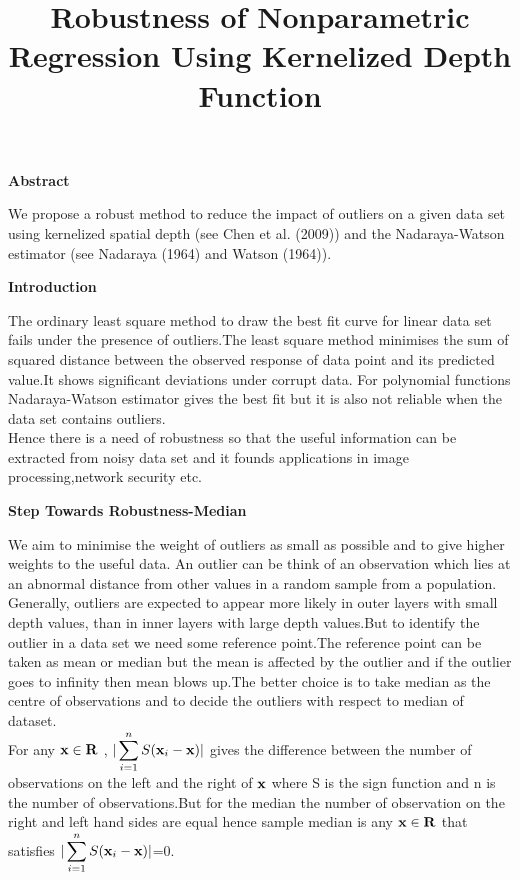 \documentclass[11pt]{article}
\newcommand{\xvec}{\mbox{\bf x}}
\begin{document}
\title{\vspace{-0.25in} Robustness of Nonparametric Regression Using Kernelized Depth Function}
\author{}
\maketitle
\begin{flushleft}
\large
\vspace{0.1in}
\textbf{Abstract}
\vspace{0.1in}

We propose a robust method to reduce the impact of outliers on a given data set using kernelized spatial depth (see Chen et al. (2009)) and the Nadaraya-Watson estimator (see Nadaraya (1964) and Watson (1964)).

\vspace{0.1in}
\textbf{Introduction}
\vspace{0.1in}

The ordinary least square method to draw the best fit curve for linear data set fails under the presence of outliers.The least square method minimises the sum of squared distance between the observed response of data point and its predicted value.It shows significant deviations under corrupt data.
For polynomial functions Nadaraya-Watson estimator gives the best fit but it is also not reliable when the data set contains outliers. \\
Hence there is a need of robustness so that the useful information can be extracted from noisy data set and it founds applications in image processing,network security etc.

\vspace{0.1in}
\textbf{Step Towards Robustness-Median}
\vspace{0.1in}

We aim to minimise the weight of outliers as small as possible and to give  higher weights to the useful data. 
An outlier can be think of an observation which lies at an abnormal distance from other values in a random sample from a population. Generally, outliers are expected to appear more likely in outer layers with small depth values, than in inner layers with large depth values.But to identify the outlier in a data set we need some reference point.The reference point can be taken as mean or median but the mean is affected by the outlier and if the outlier goes to infinity then mean blows up.The better choice is to take median as the centre of observations and to decide the outliers with respect to median of dataset. \\
For any $\xvec \in \mathbf{R}$ , $\displaystyle{\vert \sum\limits_{i=1}^n S(\xvec_i-\xvec)\vert}$ gives the
  difference between the number of observations on the left and the right of $\xvec$ where S is the sign function and n is the number of observations.But for the median the number of observation on the right and left hand sides are equal hence sample median is any $\xvec \in \mathbf{R}$ that satisfies  $\displaystyle{\vert \sum\limits_{i=1}^n S(\xvec_i-\xvec)\vert}$=0.


\end{flushleft}
\end{document}

